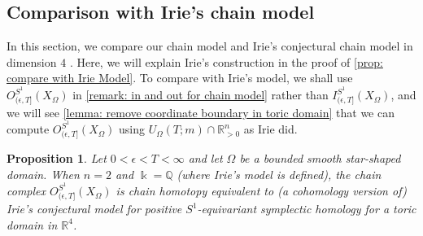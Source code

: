 \documentclass[11pt]{amsart}
\numberwithin{equation}{section}
\theoremstyle{plain}
\newtheorem{Prop}[prop]{Proposition}
\theoremstyle{definition}
\theoremstyle{remark}
\newcommand{\bQ} { {\mathbb{Q}}}
\newcommand{\bR} { {\mathbb{R}}}
\begin{document}
\subsection{Comparison with Irie's chain model}\label{section: Irie's model}
In this section, we compare our chain model and Irie's conjectural chain model in dimension $4$ \cite{Irie_ChainModel}. Here, we will explain Irie's construction in the proof of \autoref{prop: compare with Irie Model}. To compare with Irie's model, we shall use $O_{(\epsilon,T]}^{S^1}(X_\Omega)$ in \autoref{remark: in and out for chain model} rather than $I_{(\epsilon,T]}^{S^1}(X_\Omega)$, and we will see \autoref{lemma: remove coordinate boundary in toric domain} that we can compute $O_{(\epsilon,T]}^{S^1}(X_\Omega)$ using $U_\Omega(T;m)\cap \bR^n_{>0}$ as Irie did.


\begin{Prop}\label{prop: compare with Irie Model}Let $0<\epsilon<T<\infty$ and let $\Omega$ be a bounded smooth star-shaped domain. When $n=2$ and $\Bbbk=\bQ$ (where Irie's model is defined), the chain complex $O_{(\epsilon,T]}^{S^1}(X_\Omega)$ is chain homotopy equivalent to (a cohomology version of) Irie's conjectural model for positive $S^1$-equivariant symplectic homology for a toric domain in $\bR^4$.
\end{Prop}
\end{document}
